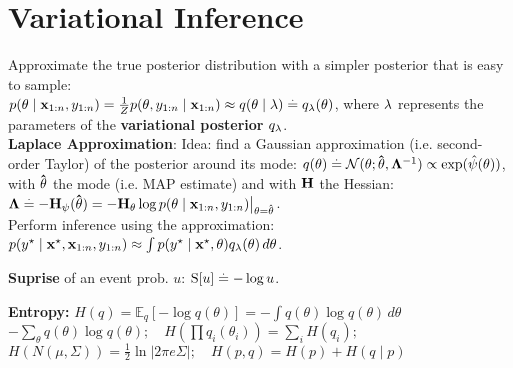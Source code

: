 \section{Variational Inference}
Approximate the true posterior distribution with a simpler posterior that is easy to sample: \\$p(\mathbf{\theta} \mid \mathbf{x}_{1:n}, y_{1:n}) = \frac{1}{Z} p(\mathbf{\theta}, y_{1:n} \mid \mathbf{x}_{1:n}) \approx q(\mathbf{\theta} \mid \mathbf{\lambda}) \overset{.}{=} q_{\mathbf{\lambda}}(\mathbf{\theta})$, where $\mathbf{\lambda}$ represents the parameters of the \textbf{variational posterior} $q_{\mathbf{\lambda}}$.\\
\textbf{Laplace Approximation}: Idea: find a Gaussian approximation (i.e. second-order Taylor) of the posterior around its mode:
$q(\vtheta) \defeq \N[\vtheta]{\vthetahat}{\inv{\mLambda}} \propto \exp(\hat{\psi}(\vtheta))$, with $\mathbf{\hat{\theta}}$ the mode (i.e. MAP estimate) and with $\mathbf{H}$ the Hessian: $\mathbf{\Lambda} \overset{.}{=} - \mathbf{H}_\psi(\mathbf{\hat{\theta}}) = - \mathbf{H}_{\mathbf{\theta}} \log p(\mathbf{\theta} \mid \mathbf{x}_{1:n}, y_{1:n}) \bigl|_{\mathbf{\theta} = \mathbf{\hat{\theta}}}$. \\
Perform inference using the approximation: $p(y^\star \mid \mathbf{x^\star}, \mathbf{x}_{1:n}, y_{1:n})  \approx \int p(y^\star \mid \mathbf{x^\star}, \mathbf{\theta}) q_{\mathbf{\lambda}}(\mathbf{\theta}) \,d\mathbf{\theta}$.
\begin{framed}
    \textbf{Suprise} of an event prob. $u$: $\S{u} \defeq - \log u$.
\end{framed}
\begin{framed}
    \textbf{Entropy:} $H(q) = \mathbb{E}_q[-\log q(\theta)] = - \int q(\theta) \log q(\theta) \, d\theta$\\
    $- \sum_{\theta} q(\theta) \log q(\theta); \quad H\left(\prod q_i(\theta_i)\right) = \sum_i H(q_i);$\\
    $H(N(\mu, \Sigma)) = \frac{1}{2} \ln |2\pi e \Sigma|; \quad H(p, q) = H(p) + H(q \mid p)$
\end{framed}


